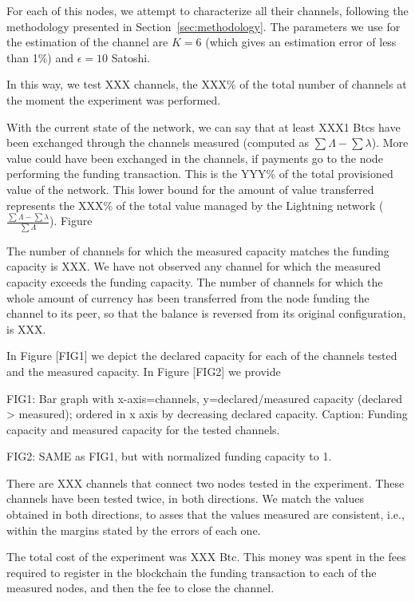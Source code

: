 For each of this nodes, we attempt to characterize all their channels, following the methodology presented in Section~\ref{sec:methodology}. 
The parameters we use for the estimation of the channel are $K=6$ (which gives an estimation error of less than 1\%) and $\epsilon = 10$ Satoshi.


In this way, we test XXX channels, the XXX\% of the total number of channels at the moment the experiment was performed. 

With the current state of the network, we can say that at least XXX1 Btcs have been exchanged through the channels measured (computed as $\sum{\Lambda}-\sum{\lambda}$). More value could have been exchanged in the channels, if payments go to the node performing the funding transaction. 
This is the YYY\% of the total provisioned value of the network. This lower bound for the amount of value transferred represents the XXX\% of the total value managed by the Lightning network ($\frac{\sum{\Lambda}-\sum{\lambda}}{\sum{\Lambda}}$). 
Figure 

The number of channels for which the measured capacity matches the funding capacity is XXX.
We have not observed any channel for which the measured capacity exceeds the funding capacity. %
The number of channels for which the whole amount of currency has been transferred from the node funding the channel to its peer, so that the balance is reversed from its original configuration, is XXX.

In Figure [FIG1] we depict the declared capacity for each of the channels tested and the measured capacity. In Figure [FIG2] we provide 

FIG1:
Bar graph with x-axis=channels, y=declared/measured capacity (declared > measured); ordered in x  axis by decreasing declared capacity.
Caption: Funding capacity and measured capacity for the tested channels.

FIG2:
SAME as FIG1, but with normalized funding capacity to 1.


There are XXX channels that connect two nodes tested in the experiment. These channels have been tested twice, in both directions. 
We match the values obtained in both directions, to asses that the values measured are consistent, i.e., within the margins stated by the errors of each one. 

The total cost of the experiment was XXX Btc. This money was spent in the fees required to register in the blockchain the funding transaction to each of the measured nodes, and then the fee to  close the channel.
